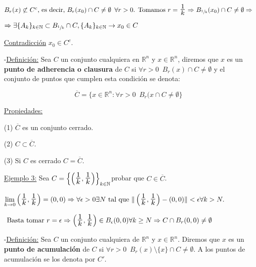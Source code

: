 \documentclass[10pt, titlepage]{article}
\newcommand{\R}{\mathbb{R}}
\newcommand{\N}{\mathbb{N}}
\newcommand{\bfrac}[2]{\scalebox{1.4}{$\frac{#1}{#2}$}}
\newcommand{\spac}{\, \, \,}
\newcommand{\definicion}{\noindent-\underline{Definición:} }
\newcommand{\dindent}{\indent\indent}
\begin{document}
$B_r (x) \not\subset C^c \text{, es decir, }
B_r (x_0) \cap C \neq \emptyset \spac  \forall{ r > 0 }\text{. Tomamos } r =  \bfrac{1}{k}
 \Rightarrow B_{\sfrac{1}{k}} (x_0) \cap C \neq \emptyset \Rightarrow$

$\Rightarrow \exists \{A_k\}_{k \in \N} \subset B_{\sfrac{1}{k}} \cap C, \{A_k\}_{k \in \N} \rightarrow x_0 
\in C$
\vspace{3mm}

\underline{Contradicción} $x_0 \in C^c$.
\vspace{5mm}


\definicion Sea $C$ un conjunto cualquiera en $\R^n$ y $x \in \R^n$, diremos que 
$x$ es un \textbf{punto de adherencia o clausura} de $C$ si $\forall{r>0} \spac B_r (x) \cap C \neq \emptyset$ y el conjunto de puntos que cumplen esta condición se denota:

\[
\boxed{\overline{C} = \{x \in \R^n : \forall{r>0} \spac B_r (x 
\cap C \neq \emptyset\}}
\]
\vspace{3mm}

\underline{Propiedades:} 
\vspace{3mm}

\dindent (1) $\overline{C}$ es un conjunto cerrado.
\vspace{3mm}

\dindent (2) $C \subset \overline{C}$.
\vspace{3mm}

\dindent (3) Si $C$ es cerrado $C = \overline{C}$.
\vspace{5mm}

\underline{Ejemplo 3:} Sea $C = \left \{ \left ( \bfrac{1}{k} , \bfrac{1}{k} \right ) \right \}_{k \in \N}
$probar que $C \in \overline{C}$.
\vspace{3mm}

\dindent $\displaystyle \lim_{k \to 0} \left (\bfrac{1}{k} , \bfrac{1}{k} \right ) = (0, 0) \Rightarrow 
\forall{\epsilon > 0} \exists N \text{ tal que  } \| \left (\bfrac{1}{k} , \bfrac{1}{k} \right ) - (0, 0) \| < \epsilon 
\forall k > N.$
\vspace{3mm}

$\text{ Basta tomar } r = \epsilon \Rightarrow \left (\bfrac{1}{k} , \bfrac{1}{k} \right ) \in B_\epsilon (0, 0) 
\forall{k \geq N} \Rightarrow C \cap B_r (0, 0) \neq \emptyset$
\vspace{7mm}


\definicion Sea $C$ un conjunto cualquiera de $\R^n$ y $x \in \R^n$. Diremos que $x$ es un 
\textbf{punto de acumulación} de $C$ si $\forall{r > 0} \spac B_r(x) \setminus \{x\} \cap C \neq 
\emptyset $. A los puntos de acumulación se los denota por $C'$.
\vspace{5mm}
\end{document}
